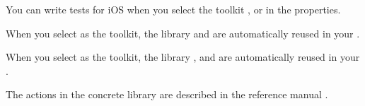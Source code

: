 You can write tests for iOS \gdauts{} when you select the toolkit ,  or  in the \gdproject{} properties.


When you select  as the \gdproject{} toolkit, the library \gdprojects{}  and  are automatically reused in your \gdproject{}. 

When you select  as the \gdproject{} toolkit, the library \gdprojects{} ,   and  are automatically reused in your \gdproject{}. 


The actions in the concrete library are described in the reference manual .
